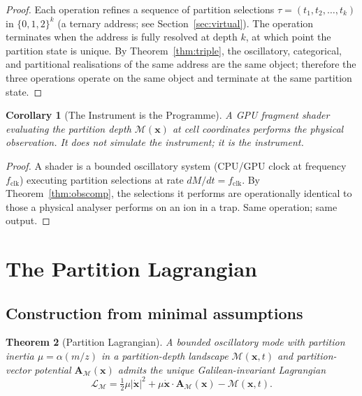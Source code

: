 \documentclass[twocolumn,10pt,a4paper]{article}
\theoremstyle{thmstyle}
\newtheorem{theorem}{Theorem}[section]
\newtheorem{corollary}[theorem]{Corollary}
\theoremstyle{definition}
\theoremstyle{remark}
\newcommand{\Depth}{\mathcal{M}}
\newcommand{\Lagr}{\mathcal{L}}
\newcommand{\Apartition}{\mathbf{A}_{\Depth}}
\newcommand{\partinert}{\mu}
\begin{document}
\begin{proof}
Each operation refines a sequence of partition selections
$\tau=(t_{1},t_{2},\ldots,t_{k})$ in $\{0,1,2\}^{k}$ (a ternary
address; see Section~\ref{sec:virtual}). The operation terminates when
the address is fully resolved at depth $k$, at which point the
partition state is unique. By Theorem~\ref{thm:triple}, the
oscillatory, categorical, and partitional realisations of the same
address are the same object; therefore the three operations operate
on the same object and terminate at the same partition state.
\end{proof}

\begin{corollary}[The Instrument is the Programme]
\label{cor:instr}
A GPU fragment shader evaluating the partition depth
$\Depth(\mathbf{x})$ at cell coordinates performs the physical
observation. It does not simulate the instrument; it is the
instrument.
\end{corollary}

\begin{proof}
A shader is a bounded oscillatory system (CPU/GPU clock at frequency
$f_{\mathrm{clk}}$) executing partition selections at rate
$dM/dt=f_{\mathrm{clk}}$. By Theorem~\ref{thm:obscomp}, the
selections it performs are operationally identical to those a
physical analyser performs on an ion in a trap. Same operation; same
output.
\end{proof}

\section{The Partition Lagrangian}
\label{sec:lagrangian}

\subsection{Construction from minimal assumptions}

\begin{theorem}[Partition Lagrangian]
\label{thm:Lag}
A bounded oscillatory mode with partition inertia
$\partinert=\alpha(m/z)$ in a partition-depth landscape
$\Depth(\mathbf{x},t)$ and partition-vector potential
$\Apartition(\mathbf{x})$ admits the unique Galilean-invariant
Lagrangian
\begin{equation}
\boxed{\;\Lagr_{\Depth}=\tfrac{1}{2}\partinert|\dot{\mathbf{x}}|^{2}
+\partinert\dot{\mathbf{x}}\cdot\Apartition(\mathbf{x})
-\Depth(\mathbf{x},t).\;}
\label{eq:Lagdef}
\end{equation}
\end{theorem}
\end{document}
